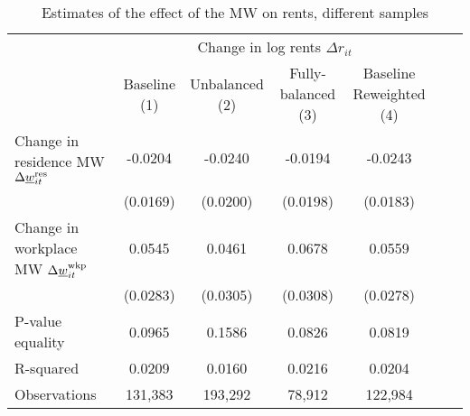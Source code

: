 \begin{table}[hbt!]
    \caption{Estimates of the effect of the MW on rents, different samples}
    \label{tab:static_sample}

    \begin{tabular}{@{}lcccccc@{}}
        \toprule
                                             & \multicolumn{4}{c}{Change in log rents $\Delta r_{it}$}                   \\ \cmidrule(l){2-5} 
                                             & \shortstack{Baseline\\(1)}       & \shortstack{Unbalanced\\(2)}     
                                             & \shortstack{Fully-balanced\\(3)} & \shortstack{Baseline\\Reweighted (4)}  \\ \midrule
        Change in residence MW 
                  $\Delta\underline{w}_{it}^{\text{res}}$    & -0.0204      & -0.0240        & -0.0194       & -0.0243               \\
                                             & (0.0169)    & (0.0200)      & (0.0198)     & (0.0183)              \\
        Change in workplace MW 
                   $\Delta\underline{w}_{it}^{\text{wkp}}$   & 0.0545      & 0.0461        & 0.0678       & 0.0559               \\
                                             & (0.0283)    & (0.0305)      & (0.0308)     & (0.0278)              \\ \midrule
        P-value equality                     & 0.0965      & 0.1586        & 0.0826       & 0.0819               \\
        R-squared                            & 0.0209      & 0.0160        & 0.0216       & 0.0204               \\
        Observations                         & 131,383     & 193,292       & 78,912      & 122,984             \\ \bottomrule
    \end{tabular}


\end{table}

